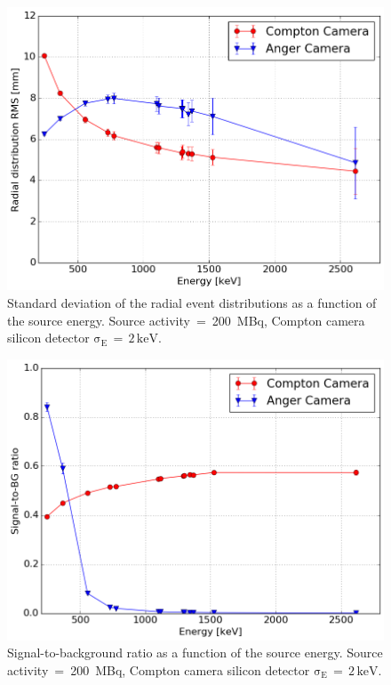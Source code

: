 \begin{figure}[h!]
\begin{center}
\includegraphics[scale=0.4]{03_GraphicFiles/chapter4/SPECT/comparison/RMSVSenergy_overlap}
\caption{Standard deviation of the radial event distributions as a function of the source energy. Source activity~=~200~MBq, Compton camera silicon detector $\mathrm{\sigma_{E}\,=\,2\,keV}$.}
\label{RMS_energy_comp}
\end{center}
\end{figure}

\begin{figure}[h!]
\begin{center}
\includegraphics[scale=0.4]{03_GraphicFiles/chapter4/SPECT/comparison/SOBVSenergy_overlap}
\caption{Signal-to-background ratio as a function of the source energy. Source activity~=~200~MBq, Compton camera silicon detector $\mathrm{\sigma_{E}\,=\,2\,keV}$.}
\label{sel_eff_energy_comp}
\end{center}
\end{figure}

